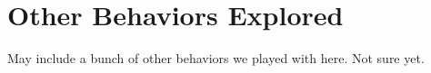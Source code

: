 \chapter{Other Behaviors Explored}
\label{AppendixA}

May include a bunch of other behaviors we played with here.
Not sure yet.
